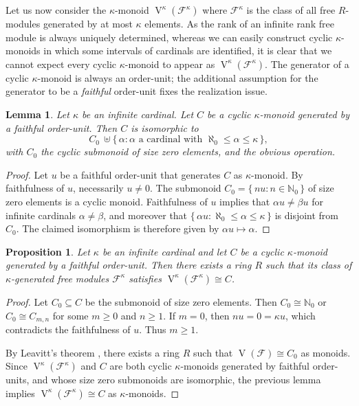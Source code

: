 \documentclass[a4paper,11pt,oneside]{amsart}
\newtheorem{lemma}[teor]{Lemma}
\newtheorem{prop}[teor]{Proposition}
\theoremstyle{remark}
\newcommand{\bN}{\mathbb N}
\DeclareMathOperator{\Vmon}{V}
\begin{document}
Let us now consider the $\kappa$-monoid $\Vmon^\kappa(\mathcal F^\kappa)$ where $\mathcal F^\kappa$ is the class of all free $R$-modules generated by at most $\kappa$ elements.
As the rank of an infinite rank free module is always uniquely determined, whereas we can easily construct cyclic $\kappa$-monoids in which some intervals of cardinals are identified, it is clear that we cannot expect every cyclic $\kappa$-monoid to appear as $\Vmon^{\kappa}(\mathcal F^\kappa)$.
The generator of a cyclic $\kappa$-monoid is always an order-unit; the additional assumption for the generator to be a \emph{faithful} order-unit fixes the realization issue.

\begin{lemma}
  Let $\kappa$ be an infinite cardinal.
  Let $C$ be a cyclic $\kappa$-monoid generated by a faithful order-unit.
  Then $C$ is isomorphic to
  \[
    C_{0} \ \uplus \{\, \alpha : \alpha \text{ a cardinal with } \aleph_0 \le \alpha \le \kappa  \,\},
  \]
  with $C_0$ the cyclic submonoid of size zero elements, and the obvious operation.
\end{lemma}

\begin{proof}
  Let $u$ be a faithful order-unit that generates $C$ as $\kappa$-monoid.
  By faithfulness of $u$, necessarily $u \ne 0$.
  The submonoid $C_0 = \{\, nu : n \in \bN_0 \,\}$ of size zero elements is a cyclic monoid.
  Faithfulness of $u$ implies that $\alpha u \ne \beta u$ for infinite cardinals $\alpha \ne \beta$, and moreover that $\{\, \alpha u : \aleph_0 \le \alpha \le \kappa \,\}$ is disjoint from $C_0$.
  The claimed isomorphism is therefore given by $\alpha u \mapsto \alpha$.
\end{proof}

\begin{prop}
  Let $\kappa$ be an infinite cardinal and let $C$ be a cyclic $\kappa$-monoid generated by a faithful order-unit.
  Then there exists a ring $R$ such that its class of $\kappa$-generated free modules $\mathcal F^\kappa$ satisfies $\Vmon^\kappa(\mathcal F^\kappa) \cong C$.
\end{prop}

\begin{proof}
  Let $C_0 \subseteq C$ be the submonoid of size zero elements.
  Then $C_0 \cong \bN_0$ or $C_0 \cong C_{m,n}$ for some $m \ge 0$ and $n \ge 1$.
  If $m =0$, then $n u = 0 = \kappa u$, which contradicts the faithfulness of $u$.
  Thus $m \ge 1$.

  By Leavitt's theorem \cite{Leavitt62}, there exists a ring $R$ such that $\Vmon(\mathcal F) \cong C_0$ as monoids.
  Since $\Vmon^\kappa(\mathcal F^\kappa)$ and $C$ are both cyclic $\kappa$-monoids generated by faithful order-units, and whose size zero submonoids are isomorphic, the previous lemma implies $\Vmon^\kappa(\mathcal F^\kappa) \cong C$ as $\kappa$-monoids.
\end{proof}
\end{document}
